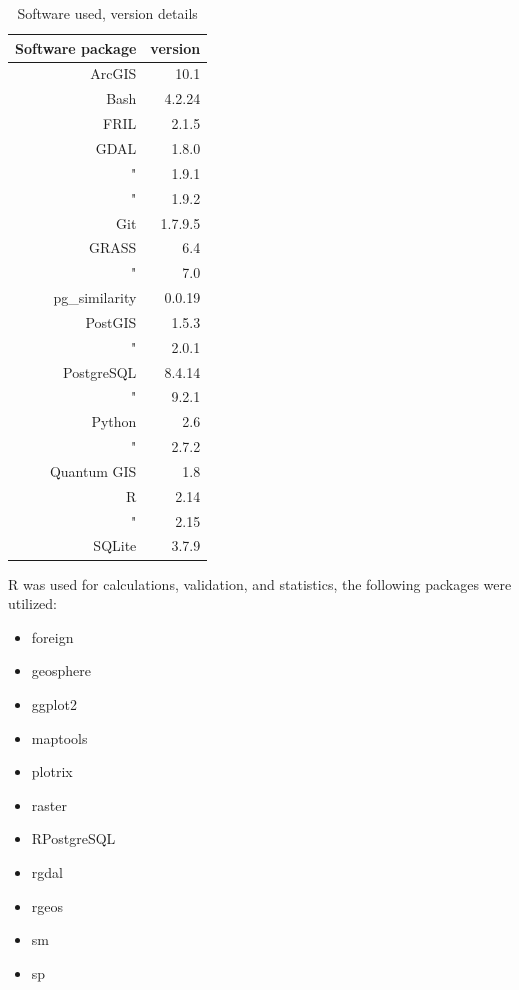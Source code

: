 \begin{table}[htbp]
  \caption[Software used]{Software used, version details}
  \ssp
  \begin{tabular}{rr}
    \hline
    Software package & version \\
    \hline
     \textsf{ArcGIS} & 10.1 \\
     \textsf{Bash} & 4.2.24 \\ 
     \textsf{FRIL} & 2.1.5 \\
     \textsf{GDAL} & 1.8.0 \\
                 " & 1.9.1 \\
                 " & 1.9.2 \\
     \textsf{Git} & 1.7.9.5 \\
     \textsf{GRASS} & 6.4 \\
                  " & 7.0 \\
     \textsf{pg\_similarity} & 0.0.19 \\
     \textsf{PostGIS} & 1.5.3 \\
                    " & 2.0.1 \\
     \textsf{PostgreSQL} & 8.4.14 \\
                      "  & 9.2.1 \\
     \textsf{Python} & 2.6 \\
                   " & 2.7.2 \\
     \textsf{Quantum GIS} & 1.8 \\
     \textsf{R} & 2.14 \\
              " & 2.15 \\
     \textsf{SQLite} & 3.7.9 \\
  \end{tabular}
  \label{table:software-used-versions}
\end{table}

R was used for calculations, validation, and statistics, the following packages were utilized:
\begin{itemize}
  \item foreign
  \item geosphere
  \item ggplot2
  \item maptools
  \item plotrix
  \item raster
  \item RPostgreSQL
  \item rgdal
  \item rgeos
  \item sm
  \item sp
\end{itemize}

